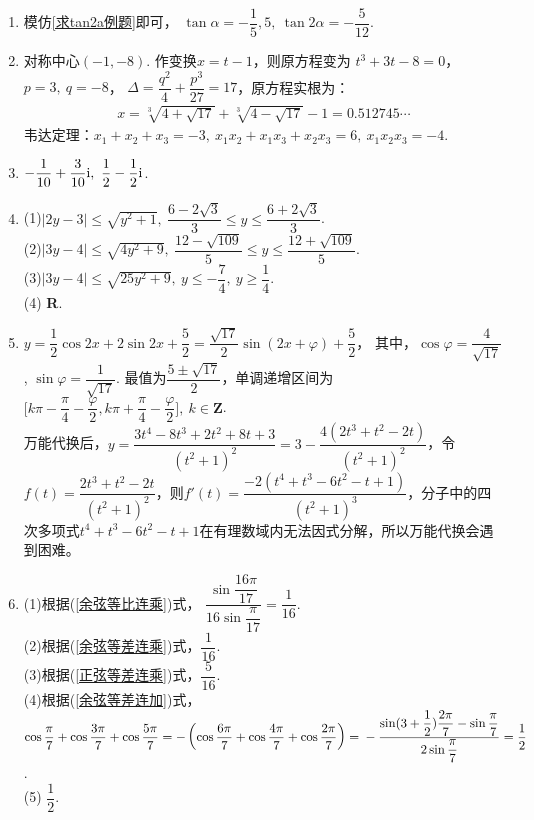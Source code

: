 \begin{enumerate}[label={\textbf{\thechapter.\arabic*}},leftmargin=
    \inteval{\myenumleftmargin}pt]
\item 模仿\ref{求tan2a例题}即可，
$ \tan\alpha=-\dfrac{1}{5},5,\ \tan2\alpha=-\dfrac{5}{12} $.  

\item 对称中心$ (-1,-8) $. 作变换$ x=t-1 $，则原方程变为
$ t^3+3t-8=0 $，$ p=3,\ q=-8 $，
$ \Delta=\dfrac{q^2}{4}+\dfrac{p^3}{27}=17 $，原方程实根为：
\begin{align*}
    x =\sqrt[3]{4+\sqrt{17}}+\sqrt[3]{4-\sqrt{17}}-1=0.512745\cdots
\end{align*}
韦达定理：$ x_1+x_2+x_3=-3,\ x_1x_2+x_1x_3+x_2x_3=6,\ x_1x_2x_3=-4 $. 

\item $ -\dfrac{1}{10}+\dfrac{3}{10}\i,\ 
\dfrac{1}{2}-\dfrac{1}{2}\i $. 

\item
(1)$ |2y-3|\leq \sqrt{y^2+1},\ \dfrac{6-2\sqrt{3}}{3}\leq y\leq \dfrac{6+2\sqrt{3}}{3} $. \\
(2)$ |3y-4|\leq \sqrt{4y^2+9},\ \dfrac{12-\sqrt{109}}{5}\leq y\leq \dfrac{12+\sqrt{109}}{5} $. \\
(3)$ |3y-4|\leq \sqrt{25y^2+9},\ y\leq -\dfrac{7}{4},\ y\geq\dfrac{1}{4} $. \\
(4) \textbf{R}.

\item
$ y=\dfrac{1}{2}\cos 2x+2\sin2x+\dfrac{5}{2}=
\dfrac{\sqrt{17}}{2}\sin(2x+\varphi)+\dfrac{5}{2} $，
其中，$ \cos\varphi=\dfrac{4}{\sqrt{17}} $, $ \sin\varphi=\dfrac{1}{\sqrt{17}} $. 
最值为$ \dfrac{5\pm \sqrt{17}}{2} $，单调递增区间为
$ \Big[k\pi-\dfrac{\pi}{4}-\dfrac{\varphi}{2},
k\pi+\dfrac{\pi}{4}-\dfrac{\varphi}{2}\Big],\ k\in \textbf{Z} $. \\
万能代换后，$ y=\dfrac{3t^4-8t^3+2t^2+8t+3}{(t^2+1)^2}=3-\dfrac{4(2t^3+t^2-2t)}
{(t^2+1)^2} $，令$ f(t)=\dfrac{2t^3+t^2-2t}{(t^2+1)^2} $，则$ f'(t)=
\dfrac{-2(t^4+t^3-6t^2-t+1)}{(t^2+1)^3} $，分子中的四次多项式$ t^4+t^3-6t^2-t+1 $在有理数域内无法因式分解，所以万能代换会遇到困难。

\item
(1)根据(\ref{余弦等比连乘})式，
$ \dfrac{\sin\dfrac{16\pi}{17}}{16\sin\dfrac{\pi}{17}}=\dfrac{1}{16} $. \\
(2)根据(\ref{余弦等差连乘})式，$ \dfrac{1}{16} $. \\
(3)根据(\ref{正弦等差连乘})式，$ \dfrac{5}{16} $. \\
(4)根据(\ref{余弦等差连加})式，$ \cos\dfrac{\pi}{7}+\cos\dfrac{3\pi}{7}+\cos\dfrac{5\pi}{7}=
-\left(\cos\dfrac{6\pi}{7}+\cos\dfrac{4\pi}{7}+\cos\dfrac{2\pi}{7}\right)= \\
-\dfrac{\sin(3+\dfrac{1}{2})\dfrac{2\pi}{7}-\sin\dfrac{\pi}{7}}{2\sin\dfrac{\pi}{7}}=\dfrac{1}{2} $. \\
(5) $ \dfrac{1}{2} $. 


\end{enumerate}
